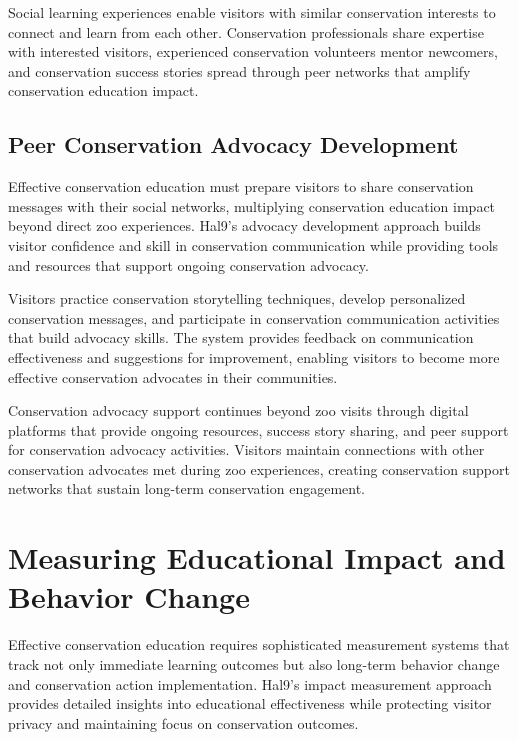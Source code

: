 \documentclass[
  Letterpaper,
]{scrbook}
\begin{document}
Social learning experiences enable visitors with similar conservation
interests to connect and learn from each other. Conservation
professionals share expertise with interested visitors, experienced
conservation volunteers mentor newcomers, and conservation success
stories spread through peer networks that amplify conservation education
impact.

\subsection{Peer Conservation Advocacy
Development}\label{peer-conservation-advocacy-development}

Effective conservation education must prepare visitors to share
conservation messages with their social networks, multiplying
conservation education impact beyond direct zoo experiences. Hal9's
advocacy development approach builds visitor confidence and skill in
conservation communication while providing tools and resources that
support ongoing conservation advocacy.

Visitors practice conservation storytelling techniques, develop
personalized conservation messages, and participate in conservation
communication activities that build advocacy skills. The system provides
feedback on communication effectiveness and suggestions for improvement,
enabling visitors to become more effective conservation advocates in
their communities.

Conservation advocacy support continues beyond zoo visits through
digital platforms that provide ongoing resources, success story sharing,
and peer support for conservation advocacy activities. Visitors maintain
connections with other conservation advocates met during zoo
experiences, creating conservation support networks that sustain
long-term conservation engagement.

\section{Measuring Educational Impact and Behavior
Change}\label{measuring-educational-impact-and-behavior-change}

Effective conservation education requires sophisticated measurement
systems that track not only immediate learning outcomes but also
long-term behavior change and conservation action implementation. Hal9's
impact measurement approach provides detailed insights into educational
effectiveness while protecting visitor privacy and maintaining focus on
conservation outcomes.
\end{document}
